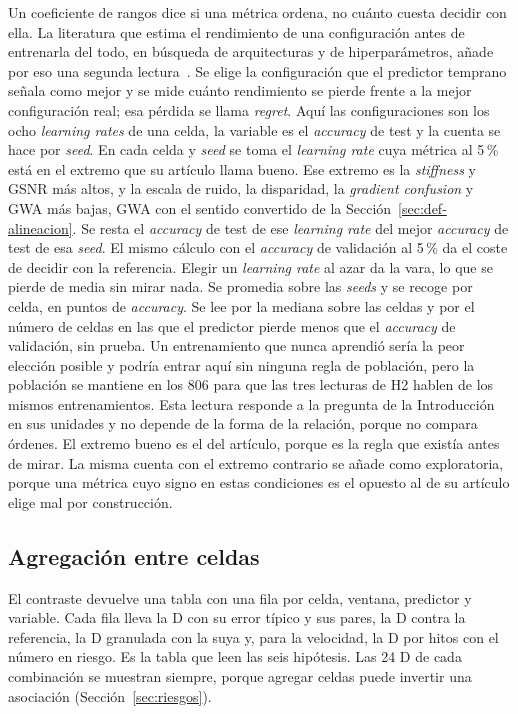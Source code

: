 Un coeficiente de rangos dice si una métrica ordena, no cuánto cuesta decidir con ella. La literatura que estima el rendimiento de una configuración antes de entrenarla del todo, en búsqueda de arquitecturas y de hiperparámetros, añade por eso una segunda lectura~\cite{abdelfattah2021zerocost,white2022deeper}. Se elige la configuración que el predictor temprano señala como mejor y se mide cuánto rendimiento se pierde frente a la mejor configuración real; esa pérdida se llama \emph{regret}. Aquí las configuraciones son los ocho \emph{learning rates} de una celda, la variable es el \emph{accuracy} de test y la cuenta se hace por \emph{seed}. En cada celda y \emph{seed} se toma el \emph{learning rate} cuya métrica al 5\,\% está en el extremo que su artículo llama bueno. Ese extremo es la \emph{stiffness} y GSNR más altos, y la escala de ruido, la disparidad, la \emph{gradient confusion} y GWA más bajas, GWA con el sentido convertido de la Sección~\ref{sec:def-alineacion}. Se resta el \emph{accuracy} de test de ese \emph{learning rate} del mejor \emph{accuracy} de test de esa \emph{seed}. El mismo cálculo con el \emph{accuracy} de validación al 5\,\% da el coste de decidir con la referencia. Elegir un \emph{learning rate} al azar da la vara, lo que se pierde de media sin mirar nada. Se promedia sobre las \emph{seeds} y se recoge por celda, en puntos de \emph{accuracy}. Se lee por la mediana sobre las celdas y por el número de celdas en las que el predictor pierde menos que el \emph{accuracy} de validación, sin prueba. Un entrenamiento que nunca aprendió sería la peor elección posible y podría entrar aquí sin ninguna regla de población, pero la población se mantiene en los 806 para que las tres lecturas de H2 hablen de los mismos entrenamientos. Esta lectura responde a la pregunta de la Introducción en sus unidades y no depende de la forma de la relación, porque no compara órdenes. El extremo bueno es el del artículo, porque es la regla que existía antes de mirar. La misma cuenta con el extremo contrario se añade como exploratoria, porque una métrica cuyo signo en estas condiciones es el opuesto al de su artículo elige mal por construcción.

\subsection{Agregación entre celdas}
\label{sec:protocolo-agregacion}

El contraste devuelve una tabla con una fila por celda, ventana, predictor y variable. Cada fila lleva la D con su error típico y sus pares, la D contra la referencia, la D granulada con la suya y, para la velocidad, la D por hitos con el número en riesgo. Es la tabla que leen las seis hipótesis. Las 24 D de cada combinación se muestran siempre, porque agregar celdas puede invertir una asociación (Sección~\ref{sec:riesgos}).

